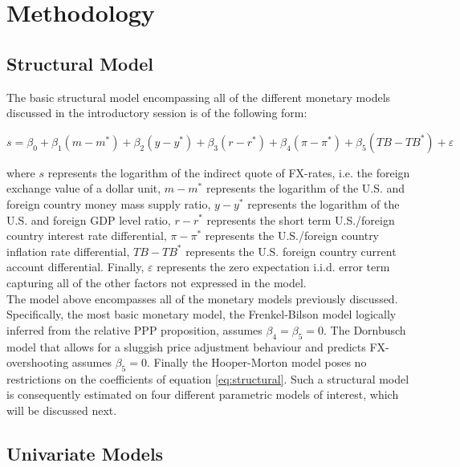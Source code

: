 \section{Methodology}
\label{sec:part2}

\subsection{Structural Model}
\label{sub:structural}

The basic structural model encompassing all of the different monetary
models discussed in the introductory session is of the following form:

\begin{equation} \label{eq:structural}
  s = \beta_{0} + \beta_{1}(m - m^{*}) + \beta_{2}(y-y^{*}) + \beta_{3}(r-r^{*})
  + \beta_{4}(\pi - \pi^{*}) + \beta_{5}(TB - TB^{*}) + \varepsilon
\end{equation}

where $s$ represents the logarithm of the indirect quote of FX-rates,
i.e. the foreign exchange value of a dollar unit, $m-m^{*}$ represents
the logarithm of the U.S. and foreign country money mass supply ratio,
$y-y^{*}$ represents the logarithm of the U.S. and foreign GDP level
ratio, $r-r^{*}$ represents the short term U.S./foreign country
interest rate differential, $\pi - \pi^{*}$ represents the
U.S./foreign country inflation rate differential, $TB - TB^{*}$
represents the U.S. foreign country current account differential.
Finally, $\varepsilon$ represents the zero expectation i.i.d. error
term capturing all of the
other factors not expressed in the model.\\
The model above encompasses all of the monetary models previously
discussed. Specifically, the most basic monetary model, the
Frenkel-Bilson model logically inferred from the relative PPP
proposition, assumes $\beta_{4} = \beta_{5} = 0$. The Dornbusch model
that allows for a sluggish price adjustment behaviour and predicts
FX-overshooting assumes $\beta_{5} = 0$. Finally the Hooper-Morton
model poses no restrictions on the coefficients of equation
\ref{eq:structural}. Such a structural model is consequently estimated
on four different parametric models of interest, which will be
discussed next.

\subsection{Univariate Models}
\label{sub:univariate}

